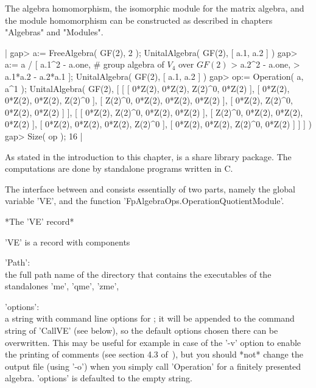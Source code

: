 The algebra homomorphism, the isomorphic module for the matrix algebra,
and the module homomorphism can be constructed as described in chapters
"Algebras" and "Modules".

|    gap> a:= FreeAlgebra( GF(2), 2 );
    UnitalAlgebra( GF(2), [ a.1, a.2 ] )
    gap> a:= a / [ a.1^2 - a.one, # group algebra of $V_4$ over $GF(2)$
    >              a.2^2 - a.one,
    >              a.1*a.2 - a.2*a.1 ];
    UnitalAlgebra( GF(2), [ a.1, a.2 ] )
    gap> op:= Operation( a, a^1 );
    UnitalAlgebra( GF(2),
    [ [ [ 0*Z(2), 0*Z(2), Z(2)^0, 0*Z(2) ], [ 0*Z(2), 0*Z(2), 0*Z(2),
              Z(2)^0 ], [ Z(2)^0, 0*Z(2), 0*Z(2), 0*Z(2) ],
          [ 0*Z(2), Z(2)^0, 0*Z(2), 0*Z(2) ] ],
      [ [ 0*Z(2), Z(2)^0, 0*Z(2), 0*Z(2) ],
          [ Z(2)^0, 0*Z(2), 0*Z(2), 0*Z(2) ],
          [ 0*Z(2), 0*Z(2), 0*Z(2), Z(2)^0 ],
          [ 0*Z(2), 0*Z(2), Z(2)^0, 0*Z(2) ] ] ] )
    gap> Size( op );
    16 |


As stated in the introduction to this chapter, {\VE} is a share library
package.  The computations are done by standalone programs written in C.

The interface between {\VE} and {\GAP} consists essentially of two parts,
namely the global variable 'VE', and the function
'FpAlgebraOps.OperationQuotientModule'.

\vspace{5mm}

*The 'VE' record*

'VE' is a record with components

'Path': \\ the full path name of the directory that contains the
           executables of the standalones 'me', 'qme', 'zme',

'options': \\
  a string with command line options for {\VE};
  it will be appended to the command string of 'CallVE' (see below),
  so the default options chosen there can be overwritten.
  This may be useful for example in case of the '-v' option to enable the
  printing of comments (see section 4.3 of~\cite{Lin93}), but you should
  *not* change the output file (using '-o') when you simply call
  'Operation' for a finitely presented algebra.
  'options' is defaulted to the empty string.

